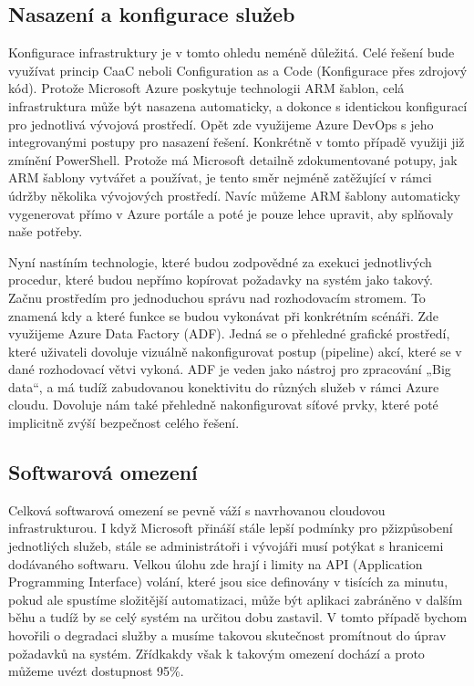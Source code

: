 \documentclass[12pt]{article}
\begin{document}
\begin{sloppypar}
\begin{spacing}{1.15}
        \subsection*{Nasazení a konfigurace služeb}
        Konfigurace infrastruktury je v tomto ohledu neméně důležitá. Celé
        řešení bude využívat princip CaaC neboli Configuration as a Code
        (Konfigurace přes zdrojový kód). Protože Microsoft Azure poskytuje
        technologii ARM šablon, celá infrastruktura může být nasazena
        automaticky, a dokonce s identickou konfigurací pro jednotlivá vývojová
        prostředí. Opět zde využijeme Azure DevOps s jeho integrovanými postupy
        pro nasazení řešení. Konkrétně v tomto případě využiji již zmínění
        PowerShell. Protože má Microsoft detailně zdokumentované potupy, jak ARM
        šablony vytvářet a používat, je tento směr nejméně zatěžující v rámci
        údržby několika vývojových prostředí. Navíc můžeme ARM šablony
        automaticky vygenerovat přímo v Azure portále a poté je pouze lehce
        upravit, aby splňovaly naše potřeby.  
        
        Nyní nastíním technologie, které budou zodpovědné za exekuci
        jednotlivých procedur, které budou nepřímo kopírovat požadavky na systém
        jako takový. Začnu  prostředím pro jednoduchou správu nad rozhodovacím
        stromem. To znamená kdy a které funkce se budou vykonávat při konkrétním
        scénáři. Zde využijeme Azure Data Factory (ADF). Jedná se o přehledné
        grafické prostředí, které uživateli dovoluje vizuálně nakonfigurovat
        postup (pipeline) akcí, které se v dané rozhodovací větvi vykoná. ADF je
        veden jako nástroj pro zpracování „Big data“, a má tudíž zabudovanou
        konektivitu do různých služeb v rámci Azure cloudu. Dovoluje nám také
        přehledně nakonfigurovat síťové prvky, které poté implicitně zvýší
        bezpečnost celého řešení.

        \subsection*{Softwarová omezení}
        Celková softwarová omezení se pevně váží s navrhovanou cloudovou
        infrastrukturou. I když Microsoft přináší stále lepší podmínky pro
        pžizpůsobení jednotliých služeb, stále se administrátoři i vývojáři musí
        potýkat s hranicemi dodávaného softwaru. Velkou úlohu zde hrají i limity
        na API (Application Programming Interface) volání, které jsou sice
        definovány v tisících za minutu, pokud ale spustíme složitější
        automatizaci, může být aplikaci zabráněno v dalším běhu a tudíž by se
        celý systém na určitou dobu zastavil. V tomto případě bychom hovořili o
        degradaci služby a musíme takovou skutečnost promítnout do úprav
        požadavků na systém. Zřídkakdy však k takovým omezení dochází a proto
        můžeme uvézt dostupnost 95\%.


\end{spacing}
\end{sloppypar}
\end{document}
